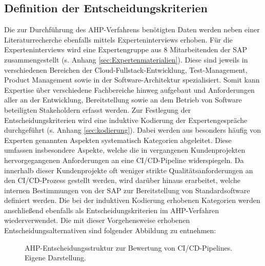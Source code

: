 \subsection{Definition der Entscheidungskriterien}
 Die zur Durchführung des AHP-Verfahrens benötigten Daten werden neben einer Literaturrecherche ebenfalls mittels Experteninterviews erhoben. Für die Experteninterviews wird eine Expertengruppe aus 8 Mitarbeitenden der SAP zusammengestellt (s. Anhang \ref{sec:Expertenmaterialien}). Diese sind jeweils in verschiedenen Bereichen der Cloud-Fullstack-Entwicklung, Test-Management, Product Management sowie in der Software-Architektur spezialisiert. Somit kann Expertise über verschiedene Fachbereiche hinweg aufgebaut und Anforderungen aller an der Entwicklung, Bereitstellung sowie an dem Betrieb von Software beteiligten Stakeholdern erfasst werden. Zur Festlegung der Entscheidungskriterien wird eine induktive Kodierung der Expertengespräche durchgeführt (s. Anhang \ref{sec:kodierung}). Dabei werden aus besonders häufig von Experten genannten Aspekten systematisch Kategorien abgeleitet. Diese umfassen insbesondere Aspekte, welche die in vergangenen Kundenprojekten hervorgegangenen Anforderungen an eine CI/CD-Pipeline widerspiegeln. Da innerhalb dieser Kundenprojekte oft weniger strikte Qualitätsanforderungen an den CI/CD-Prozess gestellt werden, wird darüber hinaus erarbeitet, welche internen Bestimmungen von der SAP zur Bereitstellung von Standardsoftware definiert werden. Die bei der induktiven Kodierung erhobenen Kategorien werden anschließend ebenfalls als Entscheidungskriterien im AHP-Verfahren wiederverwendet. Die mit dieser Vorgehensweise erhobenen Entscheidungsalternativen sind folgender Abbildung zu entnehmen:
 \begin{center}
	\begin{figure}[H]
		\centering
		\caption[AHP-Entscheidungsstruktur zur Bewertung von CI/CD-Pipelines]{AHP-Entscheidungsstruktur zur Bewertung von CI/CD-Pipelines. Eigene Darstellung.}
		\label{fig:AHP_E}
	\end{figure}
\end{center}
\vspace*{-15mm}
